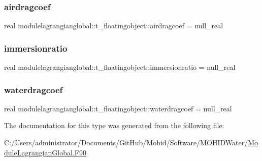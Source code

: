 \subsubsection{\texorpdfstring{airdragcoef}{airdragcoef}}
{\footnotesize\ttfamily real modulelagrangianglobal\+::t\+\_\+floatingobject\+::airdragcoef = null\+\_\+real\hspace{0.3cm}{\ttfamily [private]}}

\mbox{\label{structmodulelagrangianglobal_1_1t__floatingobject_aea8905fe19f549b1e410e0c80ffe2e1a}} 
\subsubsection{\texorpdfstring{immersionratio}{immersionratio}}
{\footnotesize\ttfamily real modulelagrangianglobal\+::t\+\_\+floatingobject\+::immersionratio = null\+\_\+real\hspace{0.3cm}{\ttfamily [private]}}

\mbox{\label{structmodulelagrangianglobal_1_1t__floatingobject_a4269b3b7749b5464b19a6cca318cbbf7}} 
\subsubsection{\texorpdfstring{waterdragcoef}{waterdragcoef}}
{\footnotesize\ttfamily real modulelagrangianglobal\+::t\+\_\+floatingobject\+::waterdragcoef = null\+\_\+real\hspace{0.3cm}{\ttfamily [private]}}



The documentation for this type was generated from the following file\+:\begin{DoxyCompactItemize}
\item 
C\+:/\+Users/administrator/\+Documents/\+Git\+Hub/\+Mohid/\+Software/\+M\+O\+H\+I\+D\+Water/\mbox{\hyperlink{_module_lagrangian_global_8_f90}{Module\+Lagrangian\+Global.\+F90}}\end{DoxyCompactItemize}
